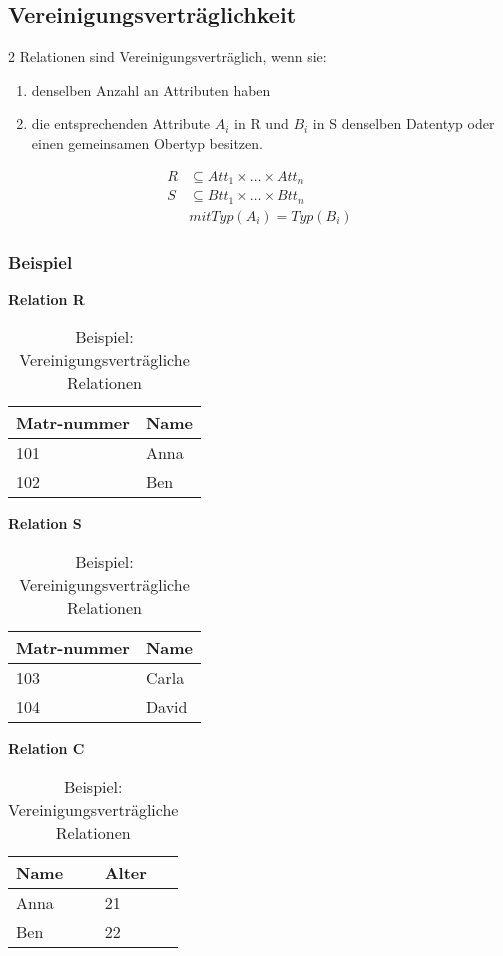 \subsection{Vereinigungsverträglichkeit}
2 Relationen sind Vereinigungsverträglich, wenn sie:
\begin{enumerate}
    \item denselben Anzahl an Attributen haben
    \item die entsprechenden Attribute $A_i$ in R und $B_i$ in S denselben Datentyp oder einen gemeinsamen Obertyp besitzen.
\end{enumerate}



\begin{tcolorbox}[red, title={Hinweis}]
    \begin{align*}
        R&\subseteq Att_1 \times \dots \times Att_n\\
        S&\subseteq Btt_1 \times \dots \times Btt_n\\
        &mit Typ(A_i) = Typ(B_i)
    \end{align*}
\end{tcolorbox}

\subsubsection{Beispiel}
\begin{table}[H]
\centering
\caption{Beispiel: Vereinigungsverträgliche Relationen}
\begin{minipage}{0.3\textwidth}
\centering
\textbf{Relation R} \\[3pt]
\begin{tabularx}{\linewidth}{|X|X|}
\hline
Matr-nummer & Name \\
\hline
101 & Anna \\
102 & Ben \\
\hline
\end{tabularx}
\end{minipage}
\hfill
\begin{minipage}{0.3\textwidth}
\centering
\textbf{Relation S} \\[3pt]
\begin{tabularx}{\linewidth}{|X|X|}
\hline
Matr-nummer & Name \\
\hline
103 & Carla \\
104 & David \\
\hline
\end{tabularx}
\end{minipage}
\hfill
\begin{minipage}{0.3\textwidth}
\centering
\textbf{Relation C} \\[3pt]
\begin{tabularx}{\linewidth}{|X|X|}
\hline
Name & Alter \\
\hline
Anna & 21 \\
Ben & 22 \\
\hline
\end{tabularx}
\end{minipage}
\end{table}

